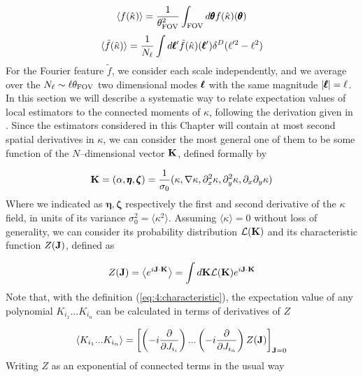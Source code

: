 \begin{equation}
\label{eq:4:average-real}
\langle f(\hat{\kappa})\rangle = \frac{1}{\theta^2_{\rm FOV}}\int_{\rm FOV}d\pmb{\theta} f(\hat{\kappa})(\pmb{\theta}) 
\end{equation}
%
\begin{equation}
\label{eq:4:average-fourier}
\langle \tilde{f}(\hat{\kappa})\rangle = \frac{1}{N_{\ell}}\int d\pmb{\ell}' \tilde{f}(\hat{\kappa})(\pmb{\ell}')\delta^D(\ell'^2-\ell^2)
\end{equation}  
%
For the Fourier feature $\tilde{f}$, we consider each scale independently, and we average over the $N_\ell\sim\ell\theta_{\rm FOV}$ two dimensional modes $\pmb{\ell}$ with the same magnitude $\vert\pmb{\ell}\vert=\ell$. In this section we will describe a systematic way to relate expectation values of local estimators to the connected moments of $\kappa$, following the derivation given in \citep{MatsubaraLong}. Since the estimators considered in this Chapter will contain at most second spatial derivatives in $\kappa$, we can consider the most general one of them to be some function of the $N$--dimensional vector $\mathbf{K}$, defined formally by

\begin{equation}
\label{eq:4:lcl-vec}
\mathbf{K} = (\alpha,\pmb{\eta},\pmb{\zeta}) = \frac{1}{\sigma_0}(\kappa,\nabla \kappa,\partial^2_x\kappa,\partial^2_y\kappa,\partial_x\partial_y\kappa)
\end{equation}
%
Where we indicated as $\pmb{\eta},\pmb{\zeta}$ respectively the first and second derivative of the $\kappa$ field, in units of its variance $\sigma_0^2=\langle\kappa^2\rangle$. Assuming $\langle\kappa\rangle=0$ without loss of generality, we can consider its probability distribution $\mathcal{L}(\mathbf{K})$ and its characteristic function $Z(\mathbf{J})$, defined as 

\begin{equation}
\label{eq:4:characteristic}
Z(\mathbf{J}) = \left\langle e^{i\mathbf{J}\cdot\mathbf{K}}\right\rangle = \int d\mathbf{K}\mathcal{L}(\mathbf{K})e^{i\mathbf{J}\cdot\mathbf{K}}
\end{equation} 
%
Note that, with the definition (\ref{eq:4:characteristic}), the expectation value of any polynomial $K_{i_1}...K_{i_n}$ can be calculated in terms of derivatives of $Z$

\begin{equation}
\label{eq:4:exp-poly}
\left\langle K_{i_1}...K_{i_n}\right\rangle = \left[\left(-i\frac{\partial}{\partial J_{i_i}}\right)...\left(-i\frac{\partial}{\partial J_{i_n}}\right)Z(\mathbf{J})\right]_{\mathbf{J}=0}
\end{equation}
%
Writing $Z$ as an exponential of connected terms in the usual way

